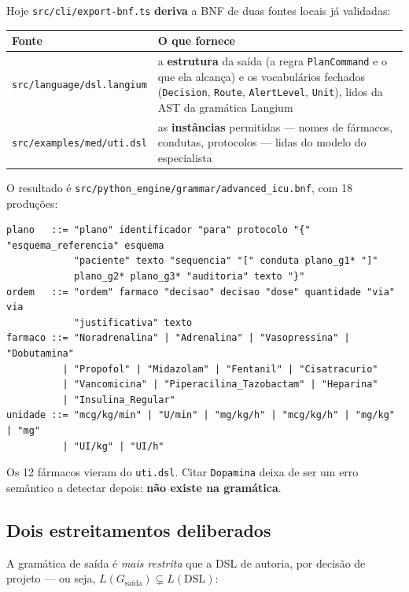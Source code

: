 \documentclass[11pt,a4paper]{article}
\newcommand{\arq}[1]{\texttt{\small #1}}
\begin{document}
Hoje \arq{src/cli/export-bnf.ts} \textbf{deriva} a BNF de duas fontes locais já
validadas:

\begin{center}
\small
\begin{tabular}{@{}p{5.2cm}p{9.0cm}@{}}
\toprule
\textbf{Fonte} & \textbf{O que fornece}\\
\midrule
\arq{src/language/dsl.langium} & a \textbf{estrutura} da saída (a regra
\texttt{PlanCommand} e o que ela alcança) e os vocabulários fechados
(\texttt{Decision}, \texttt{Route}, \texttt{AlertLevel}, \texttt{Unit}), lidos
da AST da gramática Langium\\[3pt]
\arq{src/examples/med/uti.dsl} & as \textbf{instâncias} permitidas --- nomes de
fármacos, condutas, protocolos --- lidas do modelo do especialista\\
\bottomrule
\end{tabular}
\end{center}

\vspace{2mm}

O resultado é \arq{src/python\_engine/grammar/advanced\_icu.bnf}, com 18
produções:

\begin{lstlisting}[language=bnf]
plano   ::= "plano" identificador "para" protocolo "{" "esquema_referencia" esquema
            "paciente" texto "sequencia" "[" conduta plano_g1* "]"
            plano_g2* plano_g3* "auditoria" texto "}"
ordem   ::= "ordem" farmaco "decisao" decisao "dose" quantidade "via" via
            "justificativa" texto
farmaco ::= "Noradrenalina" | "Adrenalina" | "Vasopressina" | "Dobutamina"
          | "Propofol" | "Midazolam" | "Fentanil" | "Cisatracurio"
          | "Vancomicina" | "Piperacilina_Tazobactam" | "Heparina"
          | "Insulina_Regular"
unidade ::= "mcg/kg/min" | "U/min" | "mg/kg/h" | "mcg/kg/h" | "mg/kg" | "mg"
          | "UI/kg" | "UI/h"
\end{lstlisting}

Os 12 fármacos vieram do \arq{uti.dsl}. Citar \texttt{Dopamina} deixa de ser um
erro semântico a detectar depois: \textbf{não existe na gramática}.

\subsection{Dois estreitamentos deliberados}

A gramática de saída é \emph{mais restrita} que a DSL de autoria, por decisão de
projeto --- ou seja, $L(G_{\text{saída}}) \subsetneq L(\text{DSL})$:
\end{document}
